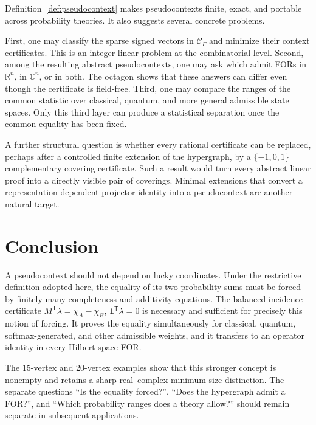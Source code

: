 \documentclass[
  twocolumn,
  aps,
  pra,
  floatfix,
  amsmath,amssymb,
  longbibliography
]{revtex4-2}
\theoremstyle{definition}
\theoremstyle{remark}
\newcommand{\R}{\mathbb R}
\newcommand{\C}{\mathbb C}
\newcommand{\one}{\mathbf 1}
\begin{document}
Definition~\ref{def:pseudocontext} makes pseudocontexts finite, exact, and portable across
probability theories.  It also suggests several concrete problems.

First, one may classify the sparse signed vectors in
$\mathcal C_\Gamma$ and minimize their context certificates.  This is an
integer-linear problem at the combinatorial level.  Second, among the
resulting abstract pseudocontexts, one may ask which admit FORs in $\R^n$,
in $\C^n$, or in both.  The octagon shows that
these answers can differ even though the certificate is field-free.  Third,
one may compare the ranges of the common statistic over classical,
quantum, and more general admissible state spaces.  Only this third layer can
produce a statistical separation once the common equality has been fixed.

A further structural question is whether every rational certificate can be
replaced, perhaps after a controlled finite extension of the hypergraph, by a
$\{-1,0,1\}$ complementary covering certificate.  Such a result would turn
every abstract linear proof into a directly visible pair of coverings.
Minimal extensions that convert a representation-dependent projector
identity into a pseudocontext are another natural target.

\section{Conclusion}

A pseudocontext should not depend on lucky coordinates.  Under the
restrictive definition adopted here, the equality of its two probability
sums must be forced by finitely many completeness and additivity equations.
The balanced incidence certificate
$M^{\mathsf T}\lambda=\chi_A-\chi_B$,
$\one^{\mathsf T}\lambda=0$ is necessary and sufficient for precisely this
notion of forcing.  It proves the equality simultaneously for classical,
quantum, softmax-generated, and other admissible weights, and it transfers to
an operator identity in every Hilbert-space FOR.

The 15-vertex and 20-vertex examples show that this stronger concept is
nonempty and retains a sharp real--complex minimum-size distinction.  The
separate questions ``Is the equality forced?'', ``Does the hypergraph admit
a FOR?'', and ``Which probability ranges does a theory
allow?'' should remain separate in subsequent applications.
\end{document}
